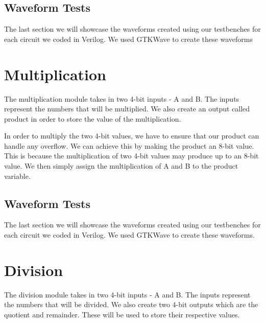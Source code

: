 \documentclass[12pt]{article}
\begin{document}
\subsection{Waveform Tests}

The last section we will showcase the waveforms created using our testbenches for each circuit we coded in Verilog. We used GTKWave to create these waveforms










\section{Multiplication}
The multiplication module takes in two 4-bit inputs - A and B. The inputs represent the numbers that will be multiplied. We also create an output called product in order to store the value of the multiplication.


In order to multiply the two 4-bit values, we have to ensure that our product can handle any overflow. We can achieve this by making the product an 8-bit value. This is because the multiplication of two 4-bit values may produce up to an 8-bit value. We then simply assign the multiplication of A and B to the product variable.






\subsection{Waveform Tests}

The last section we will showcase the waveforms created using our testbenches for each circuit we coded in Verilog. We used GTKWave to create these waveforms.







\section{Division}
The division module takes in two 4-bit inputs - A and B. The inputs represent the numbers that will be divided. We also create two 4-bit outputs which are the quotient and remainder. These will be used to store their respective values.

\end{document}
